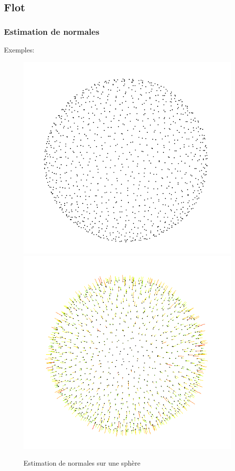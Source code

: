 \documentclass{beamer}
\begin{document}
\subsection{Flot}
\begin{frame}
    \frametitle{Estimation de normales}

    Exemples:
    \begin{figure}
        \centering
        \includegraphics[scale=0.25]{img/sphere-1000}
        \includegraphics[scale=0.25]{img/sphere-sphere-1000-05}
        \caption{Estimation de normales sur une sphère}
    \end{figure}
\end{frame}
\end{document}
